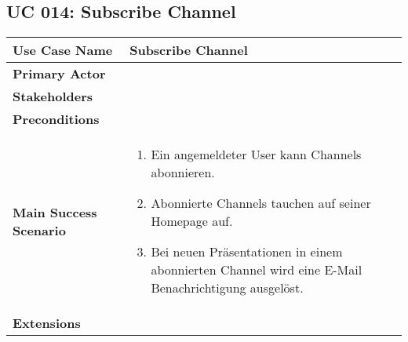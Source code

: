\subsection{UC 014: Subscribe Channel}
\label{uc:014-subscribe-channel}

\begin{tabular}{|l|p{}|}
\hline
\textbf{Use Case Name} 	&	Subscribe Channel	\\ \hline
\textbf{Primary Actor} 	&		\\ \hline
\textbf{Stakeholders}	&		\\ \hline
\textbf{Preconditions}	&		\\ \hline
\textbf{Main Success Scenario}	&
\begin{enumerate}
	\item Ein angemeldeter User kann Channels abonnieren.
	\item Abonnierte Channels tauchen auf seiner Homepage auf.
	\item Bei neuen Präsentationen in einem abonnierten Channel wird eine E-Mail Benachrichtigung ausgelöst.
\end{enumerate}
\\ \hline
\textbf{Extensions}	& 	\\ \hline
\end{tabular}